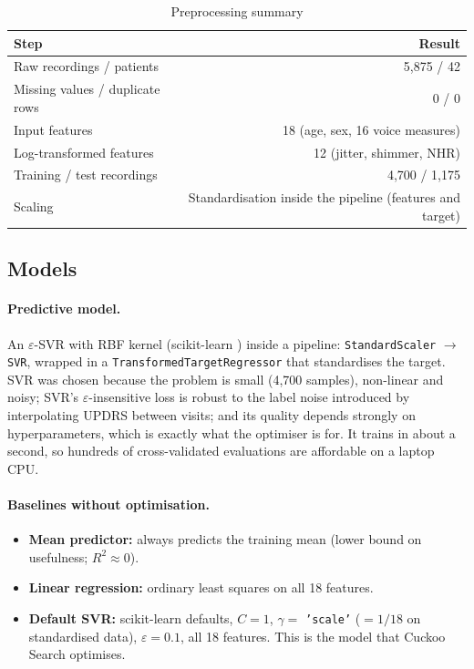 \documentclass[12pt,a4paper]{article}
\numberwithin{equation}{section}
\numberwithin{table}{section}
\numberwithin{figure}{section}
\begin{document}
\begin{table}[H]
\centering
\caption{Preprocessing summary}
\label{tab:prep}
\small
\begin{tabular}{@{}lr@{}}
\toprule
\textbf{Step} & \textbf{Result} \\ \midrule
Raw recordings / patients & 5,875 / 42 \\
Missing values / duplicate rows & 0 / 0 \\
Input features & 18 (age, sex, 16 voice measures) \\
Log-transformed features & 12 (jitter, shimmer, NHR) \\
Training / test recordings & 4,700 / 1,175 \\
Scaling & Standardisation inside the pipeline (features and target) \\ \bottomrule
\end{tabular}
\end{table}

\subsection{Models}
\paragraph{Predictive model.} An $\varepsilon$-SVR with RBF kernel (scikit-learn \cite{pedregosa2011}) inside a pipeline: \texttt{StandardScaler} $\rightarrow$ \texttt{SVR}, wrapped in a \texttt{TransformedTargetRegressor} that standardises the target. SVR was chosen because the problem is small (4,700 samples), non-linear and noisy; SVR's $\varepsilon$-insensitive loss is robust to the label noise introduced by interpolating UPDRS between visits; and its quality depends strongly on hyperparameters, which is exactly what the optimiser is for. It trains in about a second, so hundreds of cross-validated evaluations are affordable on a laptop CPU.

\paragraph{Baselines without optimisation.}
\begin{itemize}
  \item \textbf{Mean predictor:} always predicts the training mean (lower bound on usefulness; $R^2 \approx 0$).
  \item \textbf{Linear regression:} ordinary least squares on all 18 features.
  \item \textbf{Default SVR:} scikit-learn defaults, $C = 1$, $\gamma = $ \texttt{'scale'} ($=1/18$ on standardised data), $\varepsilon = 0.1$, all 18 features. This is the model that Cuckoo Search optimises.
\end{itemize}
\end{document}
